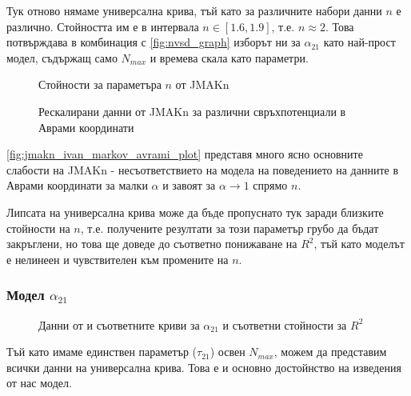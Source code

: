 Тук отново нямаме универсална крива, тъй като за различните набори данни $n$ е различно. Стойността им е в интервала $n \in [1.6, 1.9]$, т.е. $n \approx 2$. Това потвърждава в комбинация с \autoref{fig:nvsd_graph} изборът ни за $\alpha_{21}$ като най-прост модел, съдържащ само $N_{max}$ и времева скала като параметри.
\begin{figure}[H]
    \centering
    \caption{Стойности за параметъра $n$ от JMAKn}
\end{figure}
\begin{figure}[H]
    \centering
    \caption{Рескалирани данни от JMAKn за различни свръхпотенциали в Аврами координати}
    \label{fig:jmakn_ivan_markov_avrami_plot}
\end{figure}
\autoref{fig:jmakn_ivan_markov_avrami_plot} представя много ясно основните слабости на JMAKn - несъответствието на модела на поведението на данните в Аврами координати за малки $\alpha$ и завоят за $\alpha \rightarrow 1$ спрямо $n$.

Липсата на универсална крива може да бъде пропуснато тук заради близките стойности на $n$, т.е. получените резултати за този параметър грубо да бъдат закръглени, но това ще доведе до съответно понижаване на $R^2$, тъй като моделът е нелинеен и чувствителен към промените на $n$.
\subsubsection{Модел \texorpdfstring{$\alpha_{21}$}{α21}}
\begin{figure}[H]
    \centering
    \caption{Данни от \cite{Markov1976} и съответните криви за $\alpha_{21}$ и съответни стойности за $R^2$}
\end{figure}

Тъй като имаме единствен параметър ($\tau_{21}$) освен $N_{max}$, можем да представим всички данни на универсална крива. Това е и основно достойнство на изведения от нас модел.


